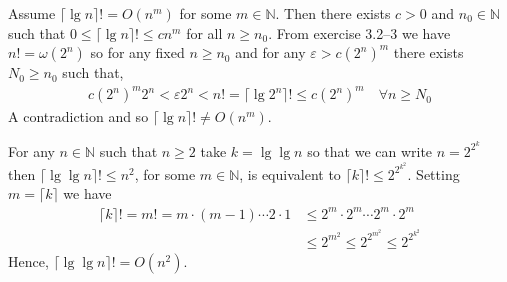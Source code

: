 Assume $\lceil\lg n\rceil!=O(n^{m})$ for some $m\in\mathbb{N}$. Then there exists $c>0$ and $n_{0}\in\mathbb{N}$ such that $0\leq \lceil\lg n\rceil!\leq cn^{m}$ for all $n\geq n_{0}$. From exercise 3.2--3 we have $n!=\omega(2^{n})$ so for any fixed $n\geq n_{0}$ and for any $\varepsilon>c(2^{n})^{m}$ there exists $N_{0}\geq n_{0}$ such that,
\begin{equation*}
	\begin{aligned}
		c(2^{n})^{m}2^{n} < \varepsilon 2^{n} < n! = \lceil\lg 2^{n}\rceil! \leq c (2^{n})^{m}\quad\forall n\geq N_{0}
	\end{aligned}
\end{equation*}
A contradiction and so $\lceil\lg n\rceil!\neq O(n^{m})$.

For any $n\in\mathbb{N}$ such that $n\geq 2$ take $k=\lg\lg n$ so that we can write $n=2^{2^{k}}$ then $\lceil\lg\lg n\rceil!\leq n^{2}$, for some $m\in\mathbb{N}$, is equivalent to $\lceil k\rceil!\leq 2^{2^{k^{2}}}$. Setting $m=\lceil k\rceil$ we have
\begin{equation*}
	\begin{aligned}
		\lceil k\rceil! = m! = m\cdot(m-1)\cdots2\cdot1 &\leq 2^{m}\cdot2^{m}\cdots2^{m}\cdot2^{m}\\
		&\leq 2^{m^{2}} \leq 2^{2^{m^{2}}} \leq 2^{2^{k^{2}}}
	\end{aligned}
\end{equation*}
Hence, $\lceil\lg\lg n\rceil!=O(n^{2})$.
